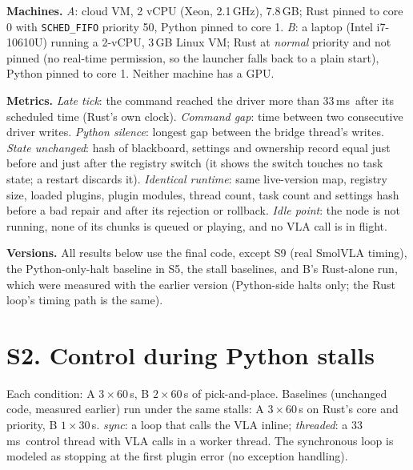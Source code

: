 \documentclass[10pt,letterpaper]{article}
\newcommand{\ms}{\,ms}
\begin{document}
\textbf{Machines.} \emph{A}: cloud VM, 2 vCPU (Xeon, 2.1\,GHz), 7.8\,GB; Rust pinned to core 0 with \texttt{SCHED\_FIFO} priority 50, Python pinned to core 1. \emph{B}: a laptop (Intel i7-10610U) running a 2-vCPU, 3\,GB Linux VM; Rust at \emph{normal} priority and not pinned (no real-time permission, so the launcher falls back to a plain start), Python pinned to core 1. Neither machine has a GPU.

\textbf{Metrics.} \emph{Late tick}: the command reached the driver more than 33\ms\ after its scheduled time (Rust's own clock). \emph{Command gap}: time between two consecutive driver writes. \emph{Python silence}: longest gap between the bridge thread's writes. \emph{State unchanged}: hash of blackboard, settings and ownership record equal just before and just after the registry switch (it shows the switch touches no task state; a restart discards it). \emph{Identical runtime}: same live-version map, registry size, loaded plugins, plugin modules, thread count, task count and settings hash before a bad repair and after its rejection or rollback. \emph{Idle point}: the node is not running, none of its chunks is queued or playing, and no VLA call is in flight.

\textbf{Versions.} All results below use the final code, except S9 (real SmolVLA timing), the Python-only-halt baseline in S5, the stall baselines, and B's Rust-alone run, which were measured with the earlier version (Python-side halts only; the Rust loop's timing path is the same).

\section*{S2. Control during Python stalls}
Each condition: A $3\times60$\,s, B $2\times60$\,s of pick-and-place. Baselines (unchanged code, measured earlier) run under the same stalls: A $3\times60$\,s on Rust's core and priority, B $1\times30$\,s. \emph{sync}: a loop that calls the VLA inline; \emph{threaded}: a 33\ms\ control thread with VLA calls in a worker thread. The synchronous loop is modeled as stopping at the first plugin error (no exception handling).
\end{document}
